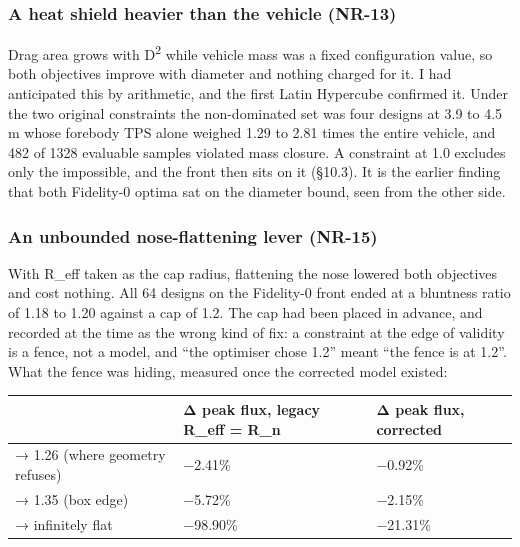 \documentclass[
  a4paper,
  11pt]{article}
\newcommand{\tabhead}[1]{{\sffamily\bfseries\fontsize{8.5}{10.5}\selectfont #1}}
\begin{document}
\subsubsection{A heat shield heavier than the vehicle
(NR-13)}\label{a-heat-shield-heavier-than-the-vehicle-nr-13}

Drag area grows with D\textsuperscript{2} while vehicle mass was a fixed
configuration value, so both objectives improve with diameter and
nothing charged for it. I had anticipated this by arithmetic, and the
first Latin Hypercube confirmed it. Under the two original constraints
the non-dominated set was four designs at 3.9 to 4.5 m whose forebody
TPS alone weighed 1.29 to 2.81 times the entire vehicle, and 482 of 1328
evaluable samples violated mass closure. A constraint at 1.0 excludes
only the impossible, and the front then sits on it (§10.3). It is the
earlier finding that both Fidelity-0 optima sat on the diameter bound,
seen from the other side.

\subsubsection{An unbounded nose-flattening lever
(NR-15)}\label{an-unbounded-nose-flattening-lever-nr-15}

With R\_eff taken as the cap radius, flattening the nose lowered both
objectives and cost nothing. All 64 designs on the Fidelity-0 front
ended at a bluntness ratio of 1.18 to 1.20 against a cap of 1.2. The cap
had been placed in advance, and recorded at the time as the wrong kind
of fix: a constraint at the edge of validity is a fence, not a model,
and ``the optimiser chose 1.2'' meant ``the fence is at 1.2''. What the
fence was hiding, measured once the corrected model existed:

\begin{center}
\small\centering
\begin{tabular}{@{}>{\raggedright\arraybackslash}p{}>{\raggedright\arraybackslash}p{}>{\raggedright\arraybackslash}p{}@{}}
\toprule
\tabhead{Bluntness change} & \tabhead{Δ peak flux, legacy R\_eff = R\_n} & \tabhead{Δ peak flux, corrected} \\
\midrule
1.2 {\symfont →} 1.26 (where geometry refuses) & −2.41\% & −0.92\% \\
1.2 {\symfont →} 1.35 (box edge) & −5.72\% & −2.15\% \\
1.2 {\symfont →} infinitely flat & −98.90\% & −21.31\% \\
\bottomrule
\end{tabular}
\end{center}
\end{document}
